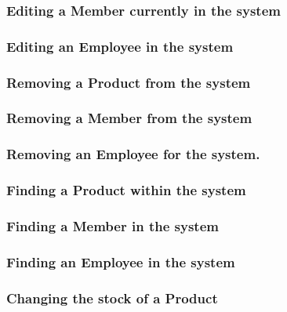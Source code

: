 \pagebreak
\subsubsection{Editing a Member currently in the system}
\label{fig:Editing a Member currently in the system}


\pagebreak
\subsubsection{Editing an Employee in the system}
\label{fig:Editing an Employee in the system}


\pagebreak
\subsubsection{Removing a Product from the system}
\label{fig:Removing a Product from the system}


\pagebreak
\subsubsection{Removing a Member from the system}
\label{fig:Removing a Member from the system}


\pagebreak
\subsubsection{Removing an Employee for the system.}
\label{fig:Removing an Employee for the system.}


\pagebreak
\subsubsection{Finding a Product within the system}
\label{fig:Finding a Product within the system}


\pagebreak
\subsubsection{Finding a Member in the system}
\label{fig:Finding a Member in the system}


\pagebreak
\subsubsection{Finding an Employee in the system}
\label{fig:Finding an Employee in the system}


\pagebreak
\subsubsection{Changing the stock of a Product}
\label{fig:Changing the stock of a Product}


